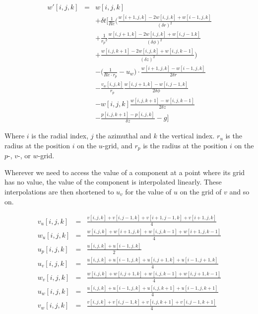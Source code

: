 \documentclass[12pt, a4paper]{article} %
\begin{document}
{			\begin{eqnarray}
				w'[i,j,k] &=& w[i,j,k]	\nonumber \\
				&& + \delta t \Bigg[ \frac{1}{Re} \bigg( \frac{w[i+1,j,k]-2w[i,j,k]+w[i-1,j,k]}{(\delta r)^2} \nonumber \\
				&& + \frac{1}{{r_p}^2} \frac{w[i,j+1,k]-2w[i,j,k]+w[i,j-1.k]}{(\delta\phi)^2} \nonumber \\
				&& + \frac{w[i,j,k+1]-2w[i,j,k]+w[i,j,k-1]}{(\delta z)^2} \bigg) \nonumber \\
				&& - \bigg(\frac{1}{Re\cdot r_p} - u_w \bigg) \cdot \frac{w[i+1,j,k]-w[i-1,j,k]}{2 \delta r} \nonumber \\
				&& - \frac{v_w[i,j,k]}{r_p} \frac{w[i,j+1,k]-w[i,j-1,k]}{2\delta \phi} \nonumber \\
				&& - w[i,j,k] \frac{w[i,j,k+1]-w[i,j,k-1]}{2\delta z} \nonumber \\
				&& - \frac{p[i,j,k+1]-p[i,j,k]}{\delta z} -g
				\Bigg]
				\label{eq:Discrete w}
			\end{eqnarray}
			}
			
			Where $i$ is the radial index, $j$ the azimuthal and $k$ the vertical index. $r_u$ is the radius at the position $i$ on the $u$-grid, and $r_p$ is the radius at the position $i$ on the $p$-, $v$-, or $w$-grid.
			
			Wherever we need to access the value of a component at a point where its grid has no value, the value of the component is interpolated linearly. These interpolations are then shortened to $u_v$ for the value of $u$ on the grid of $v$ and so on.
			
			\begin{eqnarray}
				v_u[i,j,k] &=& \frac{v[i,j,k]+v[i,j-1,k]+v[i+1,j-1,k]+v[i+1,j,k]}{4} \nonumber \\
				w_u[i,j,k] &=& \frac{w[i,j,k]+w[i+1,j,k]+w[i,j,k-1]+w[i+1,j,k-1]}{4}	\nonumber \\
				u_p[i,j,k] &=& \frac{u[i,j,k]+u[i-1,j,k]}{2} \nonumber \\ %
				u_v[i,j,k] &=& \frac{u[i,j,k]+u[i-1,j,k]+u[i,j+1,k]+u[i-1,j+1,k]}{4} \nonumber \\
				w_v[i,j,k] &=& \frac{w[i,j,k]+w[i,j+1,k]+w[i,j,k-1]+w[i,j+1,k-1]}{4} \nonumber \\
				u_w[i,j,k] &=& \frac{u[i,j,k]+u[i-1,j,k]+u[i,j,k+1]+u[i-1,j,k+1]}{4} \nonumber \\
				v_w[i,j,k] &=& \frac{v[i,j,k]+v[i,j-1,k]+v[i,j,k+1]+v[i,j-1,k+1]}{4} \nonumber
			\end{eqnarray}
			
\end{document}
